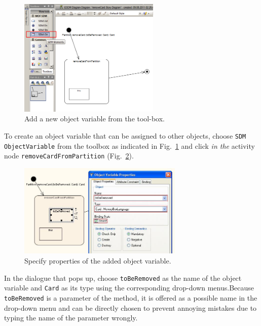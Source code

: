 \begin{figure}[htp]
\begin{center}
  \includegraphics[width=0.6\textwidth]{pics/sdmBilder/removeCard/sdm09RAW}
  \caption{Add a new object variable from the tool-box.}  
  \label{fig:tool_box}
\end{center}
\end{figure}

To create an object variable that can be assigned to other objects, choose
\texttt{SDM ObjectVariable} from the toolbox as indicated in
Fig.~\ref{fig:tool_box} and click \emph{in the} activity node \texttt{removeCardFromPartition} (Fig.~\ref{fig:object_variable_properties}). 

\begin{figure}[htp]
\begin{center}
  \includegraphics[width=0.7\textwidth]{pics/sdmBilder/removeCard/sdm10RAW}
  \caption{Specify properties of the added object variable.}  
  \label{fig:object_variable_properties}
\end{center}
\end{figure}

In the dialogue that pops up, choose \texttt{toBeRemoved} as the name of the
object variable and \texttt{Card} as its type using the corresponding drop-down
menus.\clearpage  Because \texttt{toBeRemoved} is a parameter of the method, it
is offered as a possible name in the drop-down menu and can be directly chosen to prevent
annoying mistakes due to typing the name of the parameter wrongly.

